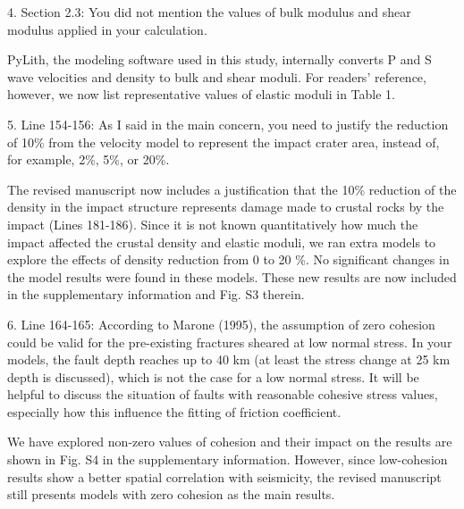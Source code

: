 \documentclass[12pt]{article}
\begin{document}
\begin{response}{4. Section 2.3: You did not mention the values of bulk modulus and shear modulus applied in your calculation.}

  PyLith, the modeling software used in this study, internally converts P and S wave velocities and density to bulk and shear moduli. For readers' reference, however, we now list representative values of elastic moduli in Table 1. 

\end{response}

\begin{response}{5. Line 154-156: As I said in the main concern, you need to justify the reduction of 10\% from the velocity model to represent the impact crater area, instead of, for example, 2\%, 5\%, or 20\%.}

  The revised manuscript now includes a justification that the 10\% reduction of the density in the impact structure represents damage made to crustal rocks by the impact (Lines 181-186). Since it is not known quantitatively how much the impact affected the crustal density and elastic moduli, we ran extra models to explore the effects of density reduction from 0 to 20 \%. No significant changes in the model results were found in these models. These new results are now included in the supplementary information and Fig. S3 therein.
\end{response}

\begin{response}{6. Line 164-165: According to Marone (1995), the assumption of zero cohesion could be valid for the pre-existing fractures sheared at low normal stress. In your models, the fault depth reaches up to 40 km (at least the stress change at 25 km depth is discussed), which is not the case for a low normal stress. It will be helpful to discuss the situation of faults with reasonable cohesive stress values, especially how this influence the fitting of friction coefficient.}
    
    We have explored non-zero values of cohesion and their impact on the results are shown in Fig. S4 in the supplementary information. However, since low-cohesion results show a better spatial correlation with seismicity, the revised manuscript still presents models with zero cohesion as the main results.
    
\end{response}
\end{document}
